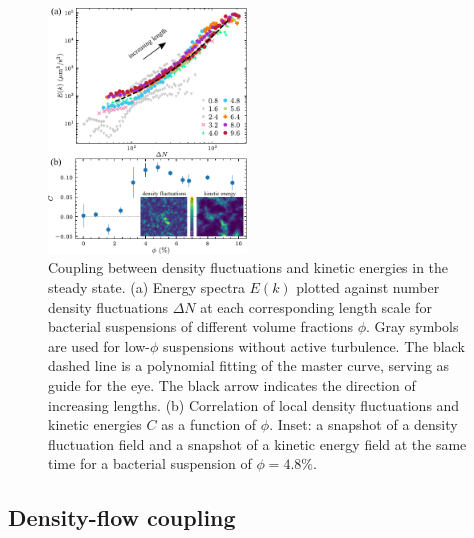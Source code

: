 \documentclass[twocolumn,aps,prx,amsmath,amssymb,longbibliography,superscriptaddress]{revtex4-2}
\begin{document}
\begin{figure}[t]
\begin{center}
\includegraphics[width=0.47\textwidth]{Figures/fig-5.pdf}
\caption[The correlation between GNF and kinetic energy and kinetic energy spectra.]
{
Coupling between density fluctuations and kinetic energies in the steady state.
(a) Energy spectra $E(k)$ plotted against number density fluctuations $\Delta N$ at each corresponding length scale for bacterial suspensions of different volume fractions $\phi$. Gray symbols are used for low-$\phi$ suspensions without active turbulence. The black dashed line is a polynomial fitting of the master curve, serving as guide for the eye. The black arrow indicates the direction of increasing lengths.
(b) Correlation of local density fluctuations and kinetic energies $C$ as a function of $\phi$. Inset: a snapshot of a density fluctuation field and a snapshot of a kinetic energy field at the same time for a bacterial suspension of $\phi = 4.8\%$.
}
\label{fig:GNF-energy-spectra-correlation}
\end{center}
\end{figure}

\subsection{Density-flow coupling} \label{Density-flow coupling}
\end{document}
